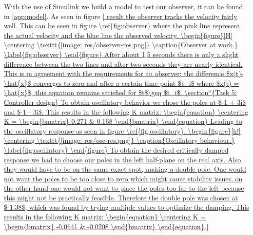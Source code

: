 \documentclass[final]{scrreprt} %
\begin{document}
With the use of Simulink we build a model to test our observer, it can be found in \ref{app:model}.
As seen in figure \ref{ result the observer tracks the velocity fairly well. This can be seen in figure \ref{fig:observer} where the pink line represent the actual velocity and the blue line the observed velocity. 

\begin{figure}[H]
\centering
\texttt{[image: res/observer-res.png]}
\caption{Observer at work.}
\label{fig:observer}
\end{figure}

After about 1,5 seconds there is only a slight difference between the two lines and after two seconds they are nearly identical. This is in agreement with the requirements for an observer; the difference $x(t)-\hat{x}$ converges to zero and after a certain time point $t_i$ where $x(t) = \hat{x}$, this equation remains satisfied for $t$\geq $t_i$.

\section*{Task 5: Controller design}

To obtain oscillatory behavior we chose the poles at $-1 + 3i$ and $-1 - 3i$. This results in the following K matrix:
\begin{equation}
\centering
K = 
\begin{bmatrix}
  0.271 & 0.168
\end{bmatrix}
\end{equation}
Leading to the oscillatory response as seen in figure \ref{fig:oscillatory}.

\begin{figure}[h!]
\centering
\texttt{[image: res/osc-res.png]}
\caption{Oscillatory behaviour.}
\label{fig:oscillatory}
\end{figure}

To obtain the desired critically damped response we had to choose our poles in the left half-plane on the real axis. Also, they would have to be on the same exact spot, making a double pole. One would not want the poles to be too close to zero which might cause stability issues, on the other hand one would not want to place the poles too far to the left because this might not be practically feasible. Therefore the double pole was chosen at $-1.38$, which was found by trying multiple values to optimize the damping. This results in the following K matrix:
\begin{equation}
\centering
K =
\begin{bmatrix}
  -0.0641 & -0.0208
\end{bmatrix}
\end{equation}

}
\end{document}
